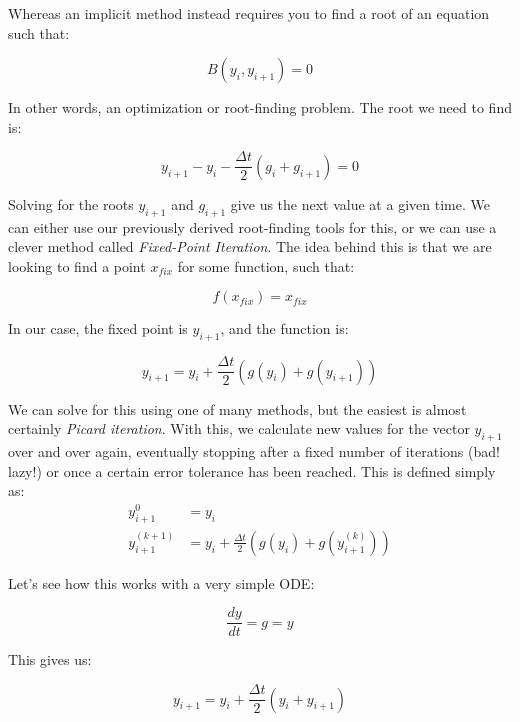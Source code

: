 \documentclass{article}
\theoremstyle{demo}
\begin{document}
Whereas an implicit method instead requires you to find a root of an equation
such that:

\begin{equation}
    B(y_i, y_{i+1}) = 0
\end{equation}

In other words, an optimization or root-finding problem.  The root we need to
find is:

\begin{equation}
    y_{i+1} - y_i - \frac{\Delta t}{2}(g_i+g_{i+1}) = 0
\end{equation}

Solving for the roots $y_{i+1}$ and $g_{i+1}$ give us the next value at a given
time.  We can either use our previously derived root-finding tools for this, or
we can use a clever method called \textit{Fixed-Point Iteration}.  The idea
behind this is that we are looking to find a point $x_{fix}$ for some function,
such that:

\begin{equation}
    f(x_{fix}) = x_{fix}
\end{equation}

In our case, the fixed point is $y_{i+1}$, and the function is:

\begin{equation}
    y_{i+1} = y_i + \frac{\Delta t}{2}(g(y_i)+g(y_{i+1}))
\end{equation}

We can solve for this using one of many methods, but the easiest is almost
certainly \textit{Picard iteration}.  With this, we calculate new values for the
vector $y_{i+1}$ over and over again, eventually stopping after a fixed number
of iterations (bad! lazy!) or once a certain error tolerance has been reached.
This is defined simply as:
\begin{equation}
    \begin{aligned}
        y^{0}_{i+1} &= y_i \\
        y^{(k+1)}_{i+1} &= y_i + \frac{\Delta t}{2}(g(y_i)+g(y^{(k)}_{i+1}))
    \end{aligned}
\end{equation}

Let's see how this works with a very simple ODE:

\begin{equation}
    \frac{dy}{dt} = g = y
\end{equation}

This gives us:

\begin{equation}
    y_{i+1} = y_i + \frac{\Delta t}{2}(y_i+y_{i+1})
\end{equation}
\end{document}
